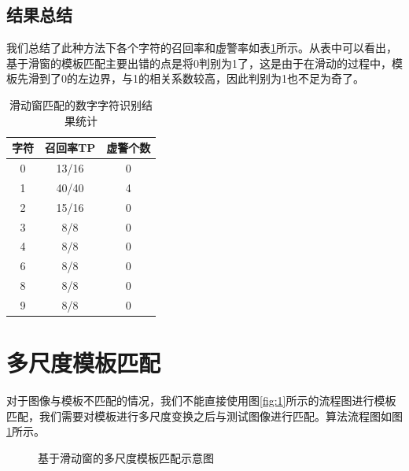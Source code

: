 \documentclass[cn]{elegantbook}
\begin{document}
\subsection{结果总结}
我们总结了此种方法下各个字符的召回率和虚警率如表\ref{tab2}所示。从表中可以看出，基于滑窗的模板匹配主要出错的点是将0判别为1了，这是由于在滑动的过程中，模板先滑到了0的左边界，与1的相关系数较高，因此判别为1也不足为奇了。
\begin{table}[!htbp]
	\centering
	\caption{滑动窗匹配的数字字符识别结果统计}\label{tab2}%
	\begin{tabular}{ccc}
		\toprule
		字符& 召回率TP& 虚警个数\\
		\midrule
		0& 13/16 & 0\\
		1& 40/40 & 4\\
		2& 15/16 & 0\\
		3& 8/8 & 0 \\
		4& 8/8 & 0 \\
		6& 8/8 & 0 \\
		8& 8/8 & 0 \\
		9& 8/8 & 0 \\
		\bottomrule
	\end{tabular}
\end{table}

\section{多尺度模板匹配}
\label{sec3}
对于图像与模板不匹配的情况，我们不能直接使用图\ref{fig:1}所示的流程图进行模板匹配，我们需要对模板进行多尺度变换之后与测试图像进行匹配。算法流程图如图\ref{fig:2}所示。

\begin{figure}[!ht]
	\centering
	\caption{\label{fig:2}基于滑动窗的多尺度模板匹配示意图}
\end{figure}
\end{document}

